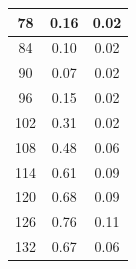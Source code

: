 \begin{tabular}{|c|c|c|}
78                                                                                  & 0.16  & 0.02           \\ \hline
84                                                                                  & 0.10  & 0.02           \\ \hline
90                                                                                  & 0.07  & 0.02           \\ \hline
96                                                                                  & 0.15  & 0.02           \\ \hline
102                                                                                 & 0.31  & 0.02           \\ \hline
108                                                                                 & 0.48  & 0.06           \\ \hline
114                                                                                 & 0.61  & 0.09           \\ \hline
120                                                                                 & 0.68  & 0.09           \\ \hline
126                                                                                 & 0.76  & 0.11           \\ \hline
132                                                                                 & 0.67  & 0.06           \\ \hline
\end{tabular}